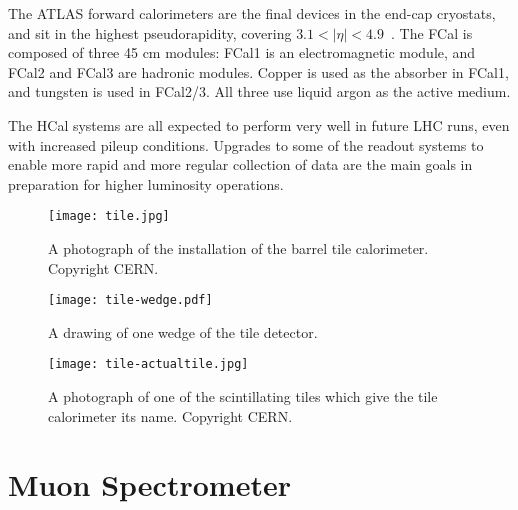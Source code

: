 The ATLAS forward calorimeters are the final devices in the end-cap cryostats, and sit in the highest pseudorapidity, covering $3.1 < |\eta| < 4.9$~\cite{ATLASPaper}. The FCal is composed of three 45 cm modules: FCal1 is an electromagnetic module, and FCal2 and FCal3 are hadronic modules. Copper is used as the absorber in FCal1, and tungsten is used in FCal2/3. All three use liquid argon as the active medium.

The HCal systems are all expected to perform very well in future LHC runs, even with increased pileup conditions. Upgrades to some of the readout systems to enable more rapid and more regular collection of data are the main goals in preparation for higher luminosity operations.


\begin{figure}
\centering
\texttt{[image: tile.jpg]}
\label{fig:detector:barrel-tile}
\caption{A photograph of the installation of the barrel tile calorimeter. Copyright CERN.}
\end{figure}



\begin{figure}
\centering
\texttt{[image: tile-wedge.pdf]}
\label{fig:detector:tile-wedge}
\caption{A drawing of one wedge of the tile detector.}
\end{figure}



\begin{figure}
\centering
\texttt{[image: tile-actualtile.jpg]}
\label{fig:detector:actualtile}
\caption{A photograph of one of the scintillating tiles which give the tile calorimeter its name. Copyright CERN.}
\end{figure}





\section{Muon Spectrometer}

